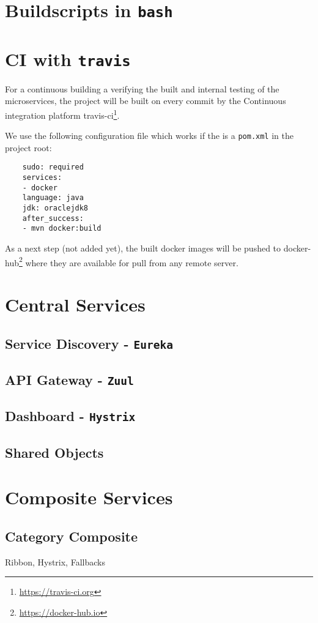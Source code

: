 \documentclass[11pt]{article}
\begin{document}
	\section{Buildscripts in \texttt{bash}}
	
	\section{CI with \texttt{travis}}
	For a continuous building a verifying the built and internal testing of the microservices, the project will be built on every commit by the Continuous integration platform travis-ci\footnote{\url{https://travis-ci.org}}.
	
	We use the following configuration file which works if the is a \texttt{pom.xml} in the project root:
	\begin{lstlisting}
	sudo: required
	services:
	- docker
	language: java
	jdk: oraclejdk8
	after_success:
	- mvn docker:build
	\end{lstlisting}
	
	As a next step (not added yet), the built docker images will be pushed to docker-hub\footnote{\url{https://docker-hub.io}} where they are available for pull from any remote server.
	
	\section{Central Services}
	\subsection{Service Discovery - \texttt{Eureka}}
	\subsection{API Gateway - \texttt{Zuul}}
	\subsection{Dashboard - \texttt{Hystrix}}
	\subsection{Shared Objects}
	
	\section{Composite Services}
	\subsection{Category Composite}
	Ribbon, Hystrix, Fallbacks
	
\end{document}
